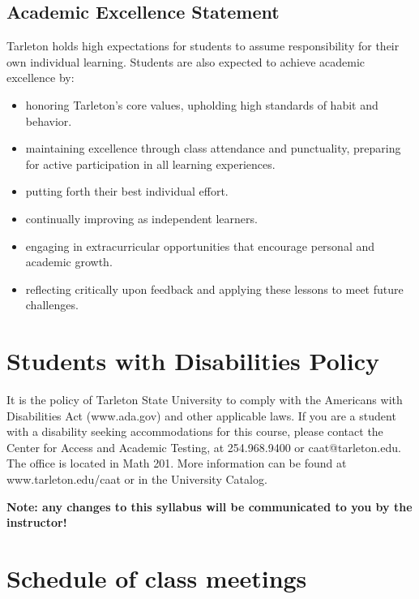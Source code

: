 \documentclass[10pt]{article}
\begin{document}
\subsection*{Academic Excellence Statement}
\label{sec:org88ffd54}
Tarleton holds high expectations for students to assume responsibility for their own individual learning. Students are also expected to achieve academic excellence by:
\begin{itemize}
\item honoring Tarleton’s core values, upholding high standards of habit and behavior.
\item maintaining excellence through class attendance and punctuality, preparing for active participation in all learning experiences.
\item putting forth their best individual effort.
\item continually improving as independent learners.
\item engaging in extracurricular opportunities that encourage personal and academic growth.
\item reflecting critically upon feedback and applying these lessons to meet future challenges.
\end{itemize}

\section*{Students with Disabilities Policy}
\label{sec:orga37da00}

It is the policy of Tarleton State University to comply with the Americans with Disabilities  Act (www.ada.gov) and other applicable laws.  If you are a student with a disability seeking accommodations for this course, please contact the Center for Access and Academic Testing, at 254.968.9400 or caat@tarleton.edu. The office is located in Math 201. More information can be found at www.tarleton.edu/caat or in the University Catalog.​

\textbf{Note:  any changes to this syllabus will be communicated to you by the instructor!}

\section*{Schedule of class meetings}
\label{sec:org0efbcdb}
\end{document}
